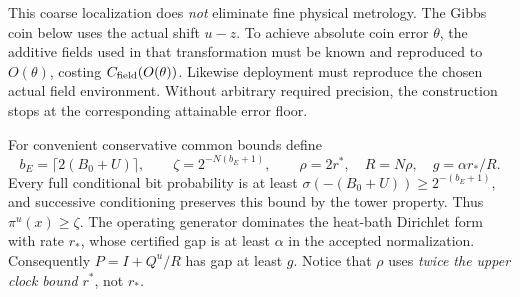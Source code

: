 \documentclass[11pt]{article}
\newcommand{\sig}{\sigma}
\begin{document}
This coarse localization does \emph{not} eliminate fine physical metrology.
The Gibbs coin below uses the actual shift $u-z$. To achieve absolute coin
error $\theta$, the additive fields used in that transformation must be
known and reproduced to $O(\theta)$, costing $C_{\rm field}(O(\theta))$.
Likewise deployment must reproduce the chosen actual field environment.
Without arbitrary required precision, the construction stops at the
corresponding attainable error floor.

For convenient conservative common bounds define
\begin{equation}\label{eq:gap}
 b_E=\lceil2(B_0+U)\rceil,\qquad
 \zeta=2^{-N(b_E+1)},\qquad
 \rho=2r^*,\quad R=N\rho,\quad g=\alpha r_*/R .
\end{equation}
Every full conditional bit probability is at least
$\sig(-(B_0+U))\ge2^{-(b_E+1)}$, and successive conditioning preserves this
bound by the tower property. Thus $\pi^u(x)\ge\zeta$.
The operating generator dominates the heat-bath Dirichlet form with rate
$r_*$, whose certified gap is at least $\alpha$ in the accepted normalization.
Consequently $P=I+Q^u/R$ has gap at least $g$. Notice that $\rho$ uses
\emph{twice the upper clock bound} $r^*$, not $r_*$.





\end{document}
